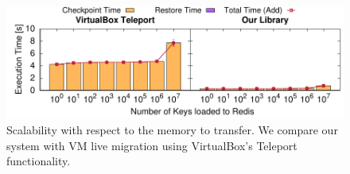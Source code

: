 \begin{figure}[h!]
    \centering
    \includegraphics[width=\textwidth]{figs/vm-teleport/vm_teleport.pdf}
    \caption[Scalability comparison with VirtualBox Teleport.]{Scalability with respect to the memory to transfer. We compare our system with VM live migration using VirtualBox's Teleport functionality.\label{fig:vm-teleport}}
\end{figure}
